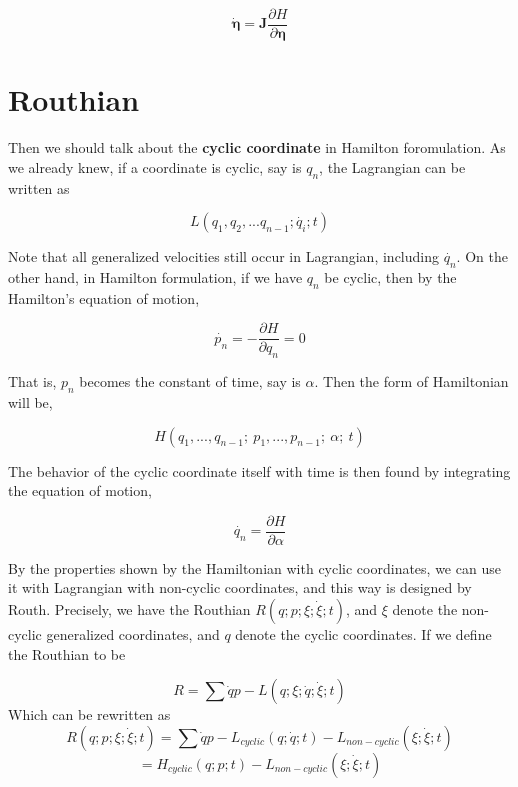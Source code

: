 \documentclass[12pt]{article}
\begin{document}
\begin{center}
    \[ \dot{\pmb{\eta}} = \pmb{J}\frac{\partial H}{\partial \pmb{\eta}} \]
\end{center}

\section{Routhian}

Then we should talk about the \textbf{cyclic coordinate} in Hamilton foromulation. As we already knew, if a coordinate is cyclic, say is $q_n$, the Lagrangian can be written as 

\begin{center}
    \[ L(q_1, q_2, ... q_{n-1}; \dot{q_i}; t) \]
\end{center}

Note that all generalized velocities still occur in Lagrangian, including $\dot{q_n}$. On the other hand, in Hamilton formulation, if we have $q_n$ be cyclic, then by the Hamilton's equation of motion,

\begin{center}
    \[ \dot{p_n} = - \frac{\partial H}{\partial q_n}  = 0 \]
\end{center}

That is, $p_n$ becomes the constant of time, say is $\alpha$. Then the form of Hamiltonian will be,

\begin{center}
    \[ H(q_1, ..., q_{n-1};\ p_1, ..., p_{n-1};\ \alpha;\ t) \]
\end{center}

The behavior of the cyclic coordinate itself with time is then found by integrating the equation of motion,

\begin{center}
    \[ \dot{q_n} = \frac{\partial H}{\partial \alpha} \]
\end{center}

By the properties shown by the Hamiltonian with cyclic coordinates, we can use it with Lagrangian with non-cyclic coordinates, and this way is designed by Routh. Precisely, we have the Routhian $R(q; p; \xi; \dot{\xi}; t)$, and $\xi$ denote the non-cyclic generalized coordinates, and $q$ denote the cyclic coordinates.
If we define the Routhian to be

\begin{center}
    \[ R = \sum{\dot{q}p} - L(q; \xi; \dot{q}; \dot{\xi}; t) \]
    Which can be rewritten as 
    \[ R(q;p;\xi;\dot{\xi};t) = \sum{\dot{q}p} - L_{cyclic}(q;\dot{q};t) - L_{non-cyclic}(\xi;\dot{\xi};t) \]
    \[ = H_{cyclic}(q;p;t) - L_{non-cyclic}(\xi;\dot{\xi};t) \]
\end{center}
\end{document}
